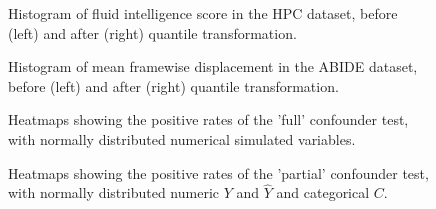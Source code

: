 \begin{figure}[H]
  \centering
  \caption{Histogram of fluid intelligence score in the HPC dataset, before (left) and after (right) quantile transformation.}
  \label{fig:hcp-hist}
\end{figure}

\begin{figure}[H]
  \centering
  \caption{Histogram of mean framewise displacement in the ABIDE dataset, before (left) and after (right) quantile transformation.}
  \label{fig:abide-hist}
\end{figure}

\begin{figure}[H]
  \centering
  \caption{Heatmaps showing the positive rates of the 'full' confounder test, with normally distributed numerical simulated variables.}
  \label{fig:sim-ccc-full}
\end{figure}


\begin{figure}[H]
  \centering
  \caption{Heatmaps showing the positive rates of the 'partial' confounder test, with normally distributed numeric $Y$ and $\hat{Y}$ and categorical $C$.}
  \label{fig:sim-ccb-partial}
\end{figure}